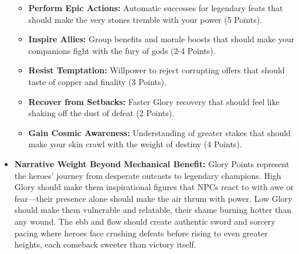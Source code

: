 \documentclass[11pt]{article}
\begin{document}
\begin{itemize}
\begin{itemize}
  \item \textbf{Perform Epic Actions:} Automatic successes for legendary feats that should make the very stones tremble with your power (5 Points).
  \item \textbf{Inspire Allies:} Group benefits and morale boosts that should make your companions fight with the fury of gods (2-4 Points).
  \item \textbf{Resist Temptation:} Willpower to reject corrupting offers that should taste of copper and finality (3 Points).
  \item \textbf{Recover from Setbacks:} Faster Glory recovery that should feel like shaking off the dust of defeat (2 Points).
  \item \textbf{Gain Cosmic Awareness:} Understanding of greater stakes that should make your skin crawl with the weight of destiny (4 Points).
  \end{itemize}
\item \textbf{Narrative Weight Beyond Mechanical Benefit:} Glory Points represent the heroes' journey from desperate outcasts to legendary champions. High Glory should make them inspirational figures that NPCs react to with awe or fear—their presence alone should make the air thrum with power. Low Glory should make them vulnerable and relatable, their shame burning hotter than any wound. The ebb and flow should create authentic sword and sorcery pacing where heroes face crushing defeats before rising to even greater heights, each comeback sweeter than victory itself.
\end{itemize}
\end{document}

